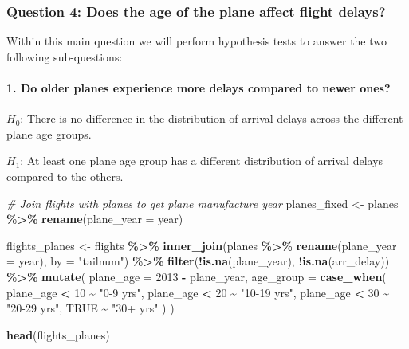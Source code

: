 \documentclass[
]{article}
\newenvironment{Shaded}{\begin{snugshade}}{\end{snugshade}}
\newcommand{\AttributeTok}[1]{\textcolor[rgb]{0.13,0.29,0.53}{#1}}
\newcommand{\CommentTok}[1]{\textcolor[rgb]{0.56,0.35,0.01}{\textit{#1}}}
\newcommand{\ConstantTok}[1]{\textcolor[rgb]{0.56,0.35,0.01}{#1}}
\newcommand{\DecValTok}[1]{\textcolor[rgb]{0.00,0.00,0.81}{#1}}
\newcommand{\FunctionTok}[1]{\textcolor[rgb]{0.13,0.29,0.53}{\textbf{#1}}}
\newcommand{\NormalTok}[1]{#1}
\newcommand{\OtherTok}[1]{\textcolor[rgb]{0.56,0.35,0.01}{#1}}
\newcommand{\SpecialCharTok}[1]{\textcolor[rgb]{0.81,0.36,0.00}{\textbf{#1}}}
\newcommand{\StringTok}[1]{\textcolor[rgb]{0.31,0.60,0.02}{#1}}
\begin{document}
\subsubsection{Question 4: Does the age of the plane affect flight
delays?}\label{question-4-does-the-age-of-the-plane-affect-flight-delays}

Within this main question we will perform hypothesis tests to answer the
two following sub-questions:

\paragraph{1. Do older planes experience more delays compared to newer
ones?~}\label{do-older-planes-experience-more-delays-compared-to-newer-ones}

\(H_0\): There is no difference in the distribution of arrival delays
across the different plane age groups.

\(H_1\): At least one plane age group has a different distribution of
arrival delays compared to the others.

\begin{Shaded}
\begin{Highlighting}[]
\CommentTok{\# Join flights with planes to get plane manufacture year}
\NormalTok{planes\_fixed }\OtherTok{\textless{}{-}}\NormalTok{ planes }\SpecialCharTok{\%\textgreater{}\%}
  \FunctionTok{rename}\NormalTok{(}\AttributeTok{plane\_year =}\NormalTok{ year)}

\NormalTok{flights\_planes }\OtherTok{\textless{}{-}}\NormalTok{ flights }\SpecialCharTok{\%\textgreater{}\%}
  \FunctionTok{inner\_join}\NormalTok{(planes }\SpecialCharTok{\%\textgreater{}\%} \FunctionTok{rename}\NormalTok{(}\AttributeTok{plane\_year =}\NormalTok{ year), }\AttributeTok{by =} \StringTok{"tailnum"}\NormalTok{) }\SpecialCharTok{\%\textgreater{}\%}
  \FunctionTok{filter}\NormalTok{(}\SpecialCharTok{!}\FunctionTok{is.na}\NormalTok{(plane\_year), }\SpecialCharTok{!}\FunctionTok{is.na}\NormalTok{(arr\_delay)) }\SpecialCharTok{\%\textgreater{}\%}
  \FunctionTok{mutate}\NormalTok{(}
    \AttributeTok{plane\_age =} \DecValTok{2013} \SpecialCharTok{{-}}\NormalTok{ plane\_year,}
    \AttributeTok{age\_group =} \FunctionTok{case\_when}\NormalTok{(}
\NormalTok{      plane\_age }\SpecialCharTok{\textless{}} \DecValTok{10} \SpecialCharTok{\textasciitilde{}} \StringTok{"0{-}9 yrs"}\NormalTok{,}
\NormalTok{      plane\_age }\SpecialCharTok{\textless{}} \DecValTok{20} \SpecialCharTok{\textasciitilde{}} \StringTok{"10{-}19 yrs"}\NormalTok{,}
\NormalTok{      plane\_age }\SpecialCharTok{\textless{}} \DecValTok{30} \SpecialCharTok{\textasciitilde{}} \StringTok{"20{-}29 yrs"}\NormalTok{,}
      \ConstantTok{TRUE} \SpecialCharTok{\textasciitilde{}} \StringTok{"30+ yrs"}
\NormalTok{    )}
\NormalTok{  )}

\FunctionTok{head}\NormalTok{(flights\_planes)}
\end{Highlighting}
\end{Shaded}
\end{document}
